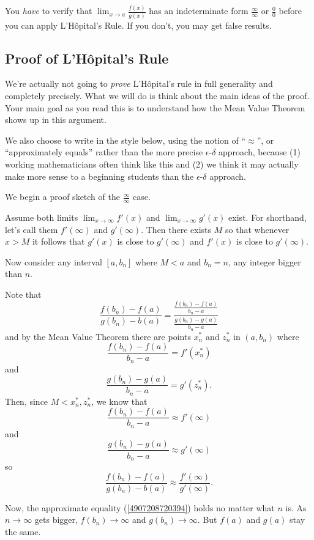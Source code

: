 \documentclass[11pt]{book}
\makeatletter
\newcounter{error}[chapter]
\newcommand{\hilight@DoHighlight}{
  \fill [ decoration = {random steps, amplitude=1pt, segment length=15pt}
        , outer sep = -15pt, inner sep = 0pt, decorate
        , every highlighter, this highlighter ]
        ($(begin highlight)+(0,8pt)$) rectangle ($(end highlight)+(0,-3pt)$) ;
}
\newcommand{\hilight@BeginHighlight}{
  \coordinate (begin highlight) at (0,0) ;
}
\newcommand{\hilight@EndHighlight}{
  \coordinate (end highlight) at (0,0) ;
}
\DeclareRobustCommand*\hilight[1][]{%
  \tikzset{this highlighter/.style={#1}}%
  \SOUL@setup
  \def\SOUL@preamble{%
    \begin{tikzpicture}[overlay, remember picture]
      \hilight@BeginHighlight
      \hilight@EndHighlight
    \end{tikzpicture}%
  }%
  \def\SOUL@postamble{%
    \begin{tikzpicture}[overlay, remember picture]
      \hilight@EndHighlight
      \hilight@DoHighlight
    \end{tikzpicture}%
  }%
  \def\SOUL@everyhyphen{%
    \discretionary{%
      \SOUL@setkern\SOUL@hyphkern
      \SOUL@sethyphenchar
      \tikz[overlay, remember picture] \hilight@EndHighlight ;%
    }{%
    }{%
      \SOUL@setkern\SOUL@charkern
    }%
  }%
  \def\SOUL@everyexhyphen##1{%
    \SOUL@setkern\SOUL@hyphkern
    \hbox{##1}%
    \discretionary{%
      \tikz[overlay, remember picture] \hilight@EndHighlight ;%
    }{%
    }{%
      \SOUL@setkern\SOUL@charkern
    }%
  }%
  \def\SOUL@everysyllable{%
    \begin{tikzpicture}[overlay, remember picture]
      \path let \p0 = (begin highlight), \p1 = (0,0) in \pgfextra
        \global\hilight@previous=\y0
        \global\hilight@current =\y1
      \endpgfextra (0,0) ;
      \ifdim\hilight@current < \hilight@previous
        \hilight@DoHighlight
        \hilight@BeginHighlight
      \fi
    \end{tikzpicture}%
    \the\SOUL@syllable
    \tikz[overlay, remember picture] \hilight@EndHighlight ;%
  }%
  \SOUL@
}
\numberwithin{example}{chapter}
\makeatother
\begin{document}
\begin{error}
You \emph{have} to verify that $\lim_{x\to a} \frac{f(x)}{g(x)}$ has an indeterminate form $\frac{\infty}{\infty}$ or $\frac{0}{0}$ before you can apply L'H\^{o}pital's Rule.  If you don't, you may get false results.  
\end{error}


\subsection{Proof of L'H\^{o}pital's Rule}

We're actually not going to \emph{prove} L'H\^{o}pital's rule in full generality and completely precisely.  What we will do is think about the main ideas of the proof.  Your main goal as you read this is to \hilight{understand how the Mean Value Theorem shows up in this argument}.

We also choose to write in the style below, using the notion of ``$\approx$'', or ``approximately equals'' rather than the more precise $\epsilon$-$\delta$ approach, because (1) working mathematicians often think like this and (2) we think it may actually make more sense to a beginning students than the $\epsilon$-$\delta$ approach.

We begin a proof sketch of the $\frac{\infty}{\infty}$ case.

Assume both limits $\lim_{x\to \infty}f'(x)$ and $\lim_{x\to \infty}g'(x)$ exist.  For shorthand, let's call them $f'(\infty)$ and $g'(\infty)$.  Then there exists $M$ so that whenever $x>M$ it follows that $g'(x)$ is close to $g'(\infty)$ and $f'(x)$ is close to $g'(\infty)$.

Now consider any interval $[a,b_n]$ where $M<a$ and  $b_n=n$, any integer bigger than $n$.    


Note that 
$$\frac{f(b_n)-f(a)}{g(b_n)-b(a)} = 
\frac{\frac{f(b_n)-f(a)}{b_n-a}}{\frac{g(b_n)-g(a)}{b_n-a}}$$
and by the Mean Value Theorem there are points $x^*_n$ and $z^*_n$ in $(a,b_n)$ where $$\frac{f(b_n)-f(a)}{b_n-a}=f'(x^*_n)$$
and 
$$\frac{g(b_n)-g(a)}{b_n-a}=g'(z^*_n).$$
Then, since $M<x^*_n,z^*_n$, we know that 
$$\frac{f(b_n)-f(a)}{b_n-a}\approx f'(\infty)$$
and 
$$\frac{g(b_n)-g(a)}{b_n-a}\approx g'(\infty)$$
so 
\begin{equation}\label{4907208720394}\frac{f(b_n)-f(a)}{g(b_n)-b(a)} \approx \frac{f'(\infty)}{g'(\infty)}.\end{equation}

Now, the approximate equality (\ref{4907208720394}) holds no matter what $n$ is.  As $n\to \infty$ gets bigger, $f(b_n)\to \infty$ and $g(b_n)\to\infty$.  But $f(a)$ and $g(a)$ stay the same.
\end{document}
